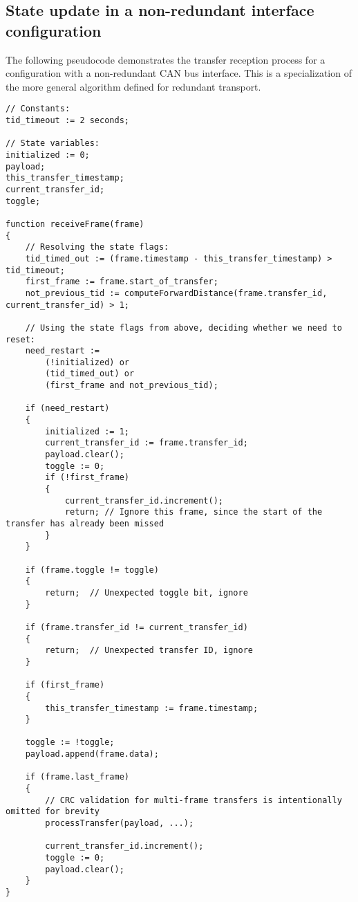 \subsection{State update in a non-redundant interface configuration}

The following pseudocode demonstrates the transfer reception process for a configuration
with a non-redundant CAN bus interface.
This is a specialization of the more general algorithm defined for redundant transport.

\clearpage
\begin{verbatim}
// Constants:
tid_timeout := 2 seconds;

// State variables:
initialized := 0;
payload;
this_transfer_timestamp;
current_transfer_id;
toggle;

function receiveFrame(frame)
{
    // Resolving the state flags:
    tid_timed_out := (frame.timestamp - this_transfer_timestamp) > tid_timeout;
    first_frame := frame.start_of_transfer;
    not_previous_tid := computeForwardDistance(frame.transfer_id, current_transfer_id) > 1;

    // Using the state flags from above, deciding whether we need to reset:
    need_restart :=
        (!initialized) or
        (tid_timed_out) or
        (first_frame and not_previous_tid);

    if (need_restart)
    {
        initialized := 1;
        current_transfer_id := frame.transfer_id;
        payload.clear();
        toggle := 0;
        if (!first_frame)
        {
            current_transfer_id.increment();
            return; // Ignore this frame, since the start of the transfer has already been missed
        }
    }

    if (frame.toggle != toggle)
    {
        return;  // Unexpected toggle bit, ignore
    }

    if (frame.transfer_id != current_transfer_id)
    {
        return;  // Unexpected transfer ID, ignore
    }

    if (first_frame)
    {
        this_transfer_timestamp := frame.timestamp;
    }

    toggle := !toggle;
    payload.append(frame.data);

    if (frame.last_frame)
    {
        // CRC validation for multi-frame transfers is intentionally omitted for brevity
        processTransfer(payload, ...);

        current_transfer_id.increment();
        toggle := 0;
        payload.clear();
    }
}
\end{verbatim}

